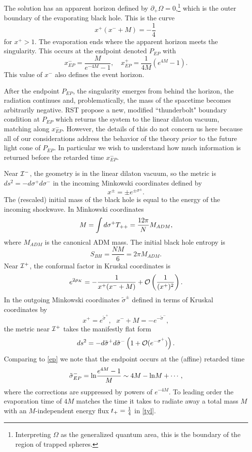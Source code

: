 \documentclass[12pt,oneside,letterpaper]{article}
\newcommand{\p}{\partial}
\newcommand{\be}{\begin{equation}}
\newcommand{\ee}{\end{equation}}
\def\be{\begin{eqnarray}}
\def\ee{\end{eqnarray}}
\let\s=\sigma \let\t=\tau \let\u=\upsilon \let\c=\chi
\def\be{\begin{equation}}
\def\ee{\end{equation}}
\def\m{{M}}
\def\log{{\rm ln}}
\renewcommand{\p}{\partial}
\numberwithin{equation}{section}
\def \be {\begin{equation}}
\def \ee {\end{equation}}
\begin{document}
The solution has an apparent horizon defined by $\p_+ \Omega = 0$,\footnote{Interpreting $\Omega$ as the generalized quantum area, this is the boundary of the region of trapped spheres.} which is the outer boundary of the evaporating black hole. This is the curve
\be
x^+ (  x^-  +{\m}{} )= -\frac{1}{4 } \ 
\ee
for $x^+>1$.
The evaporation ends where the apparent horizon meets the singularity. This occurs at the endpoint denoted $P_{EP}$ with
\be\label{ep}
x_{EP}^- = \frac{\m }{e^{-4\m } - 1} , \quad
x_{EP}^+ = \frac{1}{4\m}(e^{4 \m }-1) .
\ee
This value of $x^-$ also defines the event horizon. 

After the endpoint $P_{EP}$, the singularity emerges from behind the horizon, the radiation continues 
and, problematically, the mass of the spacetime becomes arbitrarily negative. RST propose a new, modified  
``thunderbolt" boundary condition at $P_{EP}$ which returns the system to the linear dilaton vacuum, matching along $x^-_{EP}$.
However, the details of this do  not concern us here because all of our considerations address the behavior of the theory $prior$ to the future light cone of $P_{EP}$. In particular we wish to understand how much information is returned before the retarded time  $x^-_{EP}$. 

 
Near ${\cal I}^-$, the geometry is in the linear dilaton vacuum, so the metric is $ds^2=-d\sigma^+ d\sigma^-$ in the incoming Minkowski coordinates defined by 
\be\label{imc}
 x^{\pm} = \pm e^{\pm  \sigma^\pm}  .
\ee
The (rescaled) initial mass of the black hole is equal to the energy of the incoming shockwave. In Minkowski coordinates
\be
\m = \int d\sigma^+ T_{++} ={12 \pi \over N}M_{ADM},
\ee
where $M_{ADM}$ is the canonical ADM mass. 
The initial black hole entropy is
\be\label{sinit}
S_{BH} = \frac{N \m }{6} =2\pi M_{ADM}.
\ee
Near ${\cal I}^+$, the conformal factor in Kruskal coordinates is 
\be\label{confplus}
e^{2\rho_K} = - \frac{1}{x^+ (x^- + \m)} + {\cal O}\left( \frac{1}{(x^+)^2}\right) .
\ee
In the outgoing Minkowski coordinates $\tilde \s^\pm$ defined in terms of Kruskal coordinates by 
\be \label{omc} x^+=e^{\tilde\s^+},~~~x^-+\m=-e^{-\tilde \s^-},\ee
the metric near ${\cal I}^+$ takes the manifestly  flat form 
\be ds^2=-d\tilde{\sigma}^+ d \tilde{\sigma}^-\left(1+{\cal O}(e^{-\s^+})\right).\ee
Comparing to \eqref{ep} we note that the endpoint occurs at the (affine) retarded time 
\be \label{rep} \tilde \s^-_{EP}=\log {e^{4\m}-1\over \m} \sim 4\m-\log \m+\cdots ,\ee
where the corrections are suppressed by powers of $e^{-4\m}$.
To leading order the evaporation time of $4\m$ matches the time it takes to radiate away a total mass $\m$ with an $\m$-independent energy flux 
$t_+={1 \over 4}$ in \eqref{tyl}. 
\end{document}
